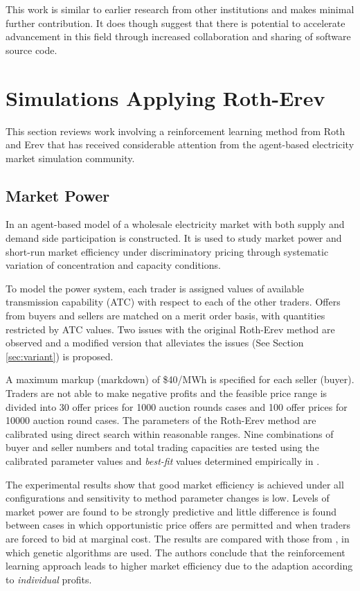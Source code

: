 This work is similar to earlier research from other institutions
\cite{wang:09,krause:nash06} and makes minimal further contribution.  It does
though suggest that there is potential to accelerate advancement in this field
through increased collaboration and sharing of software source code.

\section{Simulations Applying Roth-Erev}
This section reviews work involving a reinforcement learning method from Roth
and Erev that has received considerable attention from the agent-based electricity
market simulation community.

\subsection{Market Power}
In  an agent-based model of a wholesale electricity market
with both supply and demand side participation is constructed.  It is used to
study market power and short-run market efficiency under discriminatory pricing
through systematic variation of concentration and capacity conditions.

To model the power system, each trader is assigned values of available
transmission capability (ATC) with respect to each of the other traders. Offers
from buyers and sellers are matched on a merit order basis, with quantities
restricted by ATC values.  Two issues with the original Roth-Erev method are
observed and a modified version that alleviates the issues (See Section
\ref{sec:variant}) is proposed.

A maximum markup (markdown) of \$40/MWh is specified for each seller (buyer).
Traders are not able to make negative profits and the feasible price range
is divided into 30 offer prices for 1000 auction rounds cases and 100 offer
prices for 10000 auction round cases.  The parameters of the Roth-Erev method
are calibrated using direct search within reasonable ranges.  Nine combinations of
buyer and seller numbers and total trading capacities are tested using the
calibrated parameter values and \textit{best-fit} values determined
empirically in .

The experimental results show that good market efficiency is achieved under all
configurations and sensitivity to method parameter changes is low.  Levels of
market power are found to be strongly predictive and little difference is found
between cases in which opportunistic price offers are permitted and when traders
are forced to bid at marginal cost.  The results are compared with those from
, in which genetic algorithms are used.  The authors
conclude that the reinforcement learning approach leads to higher market
efficiency due to the adaption according to \textit{individual} profits.

